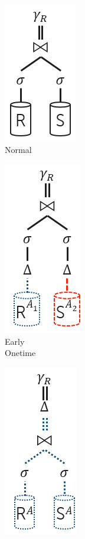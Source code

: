 
\begin{figure}%
	\captionsetup[subfigure]{justification=centering}
	\null\hfill
	\begin{subfigure}[b]{1.4cm}
		\centering
		\includegraphics[scale=0.6]{figures/QP-Normal.png}
		\caption{Normal \phantom{Onetime}}
		\label{fig:QueryProcessing:normal}
	\end{subfigure}
	\hfill
	\begin{subfigure}[b]{1.5cm}
		\centering
		\includegraphics[scale=0.6]{figures/QP-Early.png}
		\caption{Early\\Onetime}
		\label{fig:QueryProcessing:early}
	\end{subfigure}
	\hfill
	\begin{subfigure}[b]{1.5cm}
		\centering
		\includegraphics[scale=0.6]{figures/QP-Late1.png}

\end{subfigure}
\end{figure}
